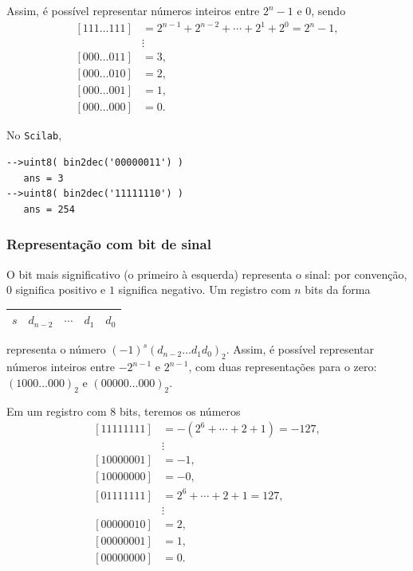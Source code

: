 Assim, é possível representar números inteiros entre $2^n-1$ e $0$, sendo
\begin{equation*}
\begin{split}
  [111\ldots 111] & = 2^{n-1}+2^{n-2}+\cdots+2^1+2^0=2^n-1,\\
                &\vdots\\
  [000\ldots 011] &= 3, \\
  [000\ldots 010] &= 2, \\
  [000\ldots 001] &= 1, \\
  [000\ldots 000] & = 0.
\end{split}
\end{equation*}

\ifisscilab
\begin{ex}
  No \verb+Scilab+,
\begin{verbatim}
-->uint8( bin2dec('00000011') )
   ans = 3
-->uint8( bin2dec('11111110') )
   ans = 254
\end{verbatim}
\end{ex}
\fi

\subsubsection{Representação com bit de sinal}
O bit mais significativo (o primeiro à esquerda) representa o sinal: por convenção, $0$ significa positivo e $1$ significa negativo. Um registro com $n$ bits da forma
\begin{center}
  \begin{tabular}{|c|c|c|c|c|} \hline
    $s$ & $d_{n-2}$ & $\cdots$ & $d_1$ & $d_0$ \\\hline
  \end{tabular}
\end{center}
representa o número $(-1)^s(d_{n-2}\ldots d_1d_0)_2$. Assim, é possível representar números inteiros entre $-2^{n-1}$ e $2^{n-1}$, com duas representações para o zero: $(1000\ldots 000)_2$ e $(00000\ldots 000)_2$.

\begin{ex}
Em um registro com $8$ bits, teremos os números
\begin{equation*}
\begin{split}
 [11111111] &= -(2^{6}+\cdots+2+1)=-127,\\
 &\vdots    \\
 [10000001] &= -1, \\
 [10000000] &= -0, \\
 [01111111] &= 2^6+\cdots+2+1=127, \\
 &\vdots    \\
 [00000010] &= 2, \\
 [00000001] &= 1, \\
 [00000000] &= 0.
\end{split}
\end{equation*}
\end{ex}


